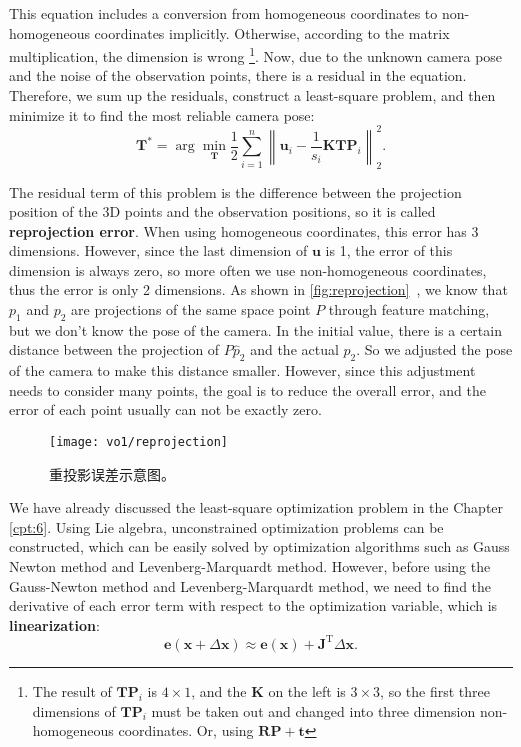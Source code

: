 This equation includes a conversion from homogeneous coordinates to non-homogeneous coordinates implicitly. Otherwise, according to the matrix multiplication, the dimension is wrong \footnote{The result of $ \bm{T} {\bm{P}_i}$ is $4 \times 1$, and the $\bm{K}$ on the left is $3 \times 3$, so the first three dimensions of $\bm{T}\bm{P}_i$ must be taken out and changed into three dimension non-homogeneous coordinates. Or, using $\bm{R}\bm{P}+\bm{t}$}. Now, due to the unknown camera pose and the noise of the observation points, there is a residual in the equation. Therefore, we sum up the residuals, construct a least-square problem, and then minimize it to find the most reliable camera pose:
\begin{equation}
{\bm{T}^*} = \arg \mathop {\min }\limits_{\bm{T}}  \frac{1}{2}\sum\limits_{i = 1}^n {\left\| {{{\bm{u}}_i} - \frac{1}{s_i} \bm{K}\bm{T}{\bm{P}}_i} \right\|_2^2} .
\end{equation}

The residual term of this problem is the difference between the projection position of the 3D points and the observation positions, so it is called \textbf{reprojection error}. When using homogeneous coordinates, this error has 3 dimensions. However, since the last dimension of ${\bm{u}}$ is 1, the error of this dimension is always zero, so more often we use non-homogeneous coordinates, thus the error is only 2 dimensions. As shown in \autoref{fig:reprojection}~, we know that $p_1$ and $p_2$ are projections of the same space point $P$ through feature matching, but we don't know the pose of the camera. In the initial value, there is a certain distance between the projection of $P \hat{p}_2$ and the actual $p_2$. So we adjusted the pose of the camera to make this distance smaller. However, since this adjustment needs to consider many points, the goal is to reduce the overall error, and the error of each point usually can not be exactly zero.

\begin{figure}[!htp]
	\centering
	\texttt{[image: vo1/reprojection]}
	\caption{重投影误差示意图。}
	\label{fig:reprojection}
\end{figure}

We have already discussed the least-square optimization problem in the Chapter \ref{cpt:6}. Using Lie algebra, unconstrained optimization problems can be constructed, which can be easily solved by optimization algorithms such as Gauss Newton method and Levenberg-Marquardt method. However, before using the Gauss-Newton method and Levenberg-Marquardt method, we need to find the derivative of each error term with respect to the optimization variable, which is \textbf{linearization}:
\begin{equation}
\bm{e}( \bm{x} + \Delta \bm{x} ) \approx \bm{e}(\bm{x}) + \bm{J} ^\mathrm{T}\Delta \bm{x}.
\end{equation}

